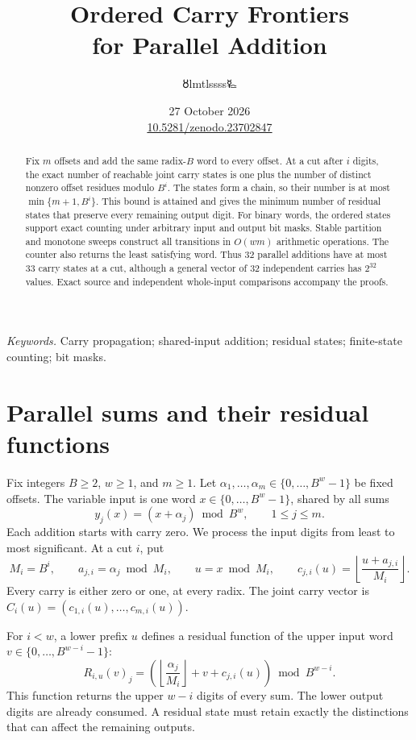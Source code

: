 \documentclass[11pt,a4paper]{article}
\title{\LARGE Ordered Carry Frontiers\\for Parallel Addition}
\author{{\authorsymbol 🜘}lmtlssss{\authorsymbol 🜐}}
\date{27 October 2026\\[3pt]\small\href{https://doi.org/10.5281/zenodo.23702847}{10.5281/zenodo.23702847}}
\begin{document}
\maketitle\thispagestyle{plain}
\begin{abstract}
Fix $m$ offsets and add the same radix-$B$ word to every offset.
At a cut after $i$ digits, the exact number of reachable joint carry states is
one plus the number of distinct nonzero offset residues modulo $B^i$.
The states form a chain, so their number is at most
$\min\{m+1,B^i\}$. This bound is attained and gives the minimum number of
residual states that preserve every remaining output digit.
For binary words, the ordered states support exact counting under arbitrary
input and output bit masks. Stable partition and monotone sweeps construct
all transitions in $O(wm)$ arithmetic operations. The counter also returns
the least satisfying word. Thus 32 parallel additions have at most
33 carry states at a cut, although a general vector of 32 independent carries
has $2^{32}$ values. Exact source and independent whole-input comparisons
accompany the proofs.
\end{abstract}
\noindent\textit{Keywords.} Carry propagation; shared-input addition;
residual states; finite-state counting; bit masks.

\section{Parallel sums and their residual functions}
Fix integers $B\geq2$, $w\geq1$, and $m\geq1$.
Let $\alpha_1,\ldots,\alpha_m\in\{0,\ldots,B^w-1\}$ be fixed offsets.
The variable input is one word $x\in\{0,\ldots,B^w-1\}$, shared by all sums
\begin{equation}\label{eq:sums}
 y_j(x)=(x+\alpha_j)\bmod B^w,\qquad 1\leq j\leq m.
\end{equation}
Each addition starts with carry zero. We process the input digits from least
to most significant. At a cut $i$, put
\begin{equation}\label{eq:carry}
 M_i=B^i,\qquad a_{j,i}=\alpha_j\bmod M_i,\qquad
 u=x\bmod M_i,\qquad
 c_{j,i}(u)=\left\lfloor\frac{u+a_{j,i}}{M_i}\right\rfloor.
\end{equation}
Every carry is either zero or one, at every radix.
The joint carry vector is $C_i(u)=(c_{1,i}(u),\ldots,c_{m,i}(u))$.

For $i<w$, a lower prefix $u$ defines a residual function of the upper
input word $v\in\{0,\ldots,B^{w-i}-1\}$:
\begin{equation}\label{eq:residual}
 R_{i,u}(v)_j=
 \left(\left\lfloor\frac{\alpha_j}{M_i}\right\rfloor
       +v+c_{j,i}(u)\right)\bmod B^{w-i}.
\end{equation}
This function returns the upper $w-i$ digits of every sum.
The lower output digits are already consumed. A residual state must retain
exactly the distinctions that can affect the remaining outputs.
\end{document}
